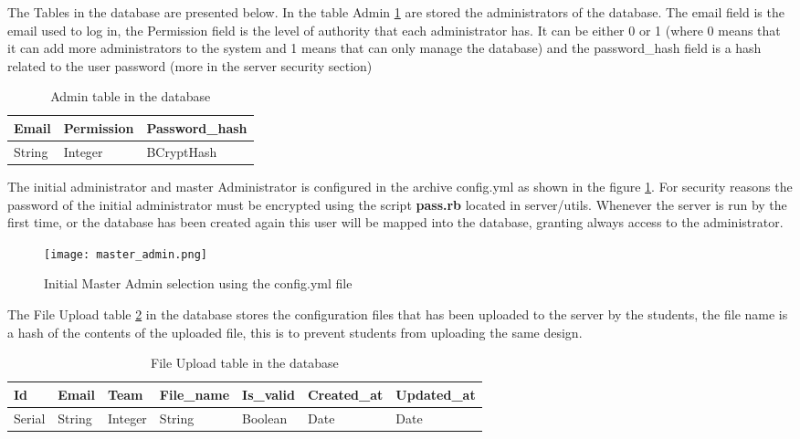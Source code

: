 The Tables in the database are presented below. In the table Admin \ref{tab:admin_table} are stored the administrators of the database. The email field is the email used to log in,
the Permission field is the level of authority that each administrator has. It can be either 0 or 1 (where 0 means that it can add
more administrators to the system and 1 means that can only manage the database) and the password\_hash field is a hash related to the user password (more in the server security section)

\begin{table}[h!]
\centering
    \begin{tabular}{ | l | l | l |}
    \hline
    Email & Permission & Password\_hash  \\ \hline
    String & Integer & BCryptHash \\ \hline
    \end{tabular}
    \caption{Admin table in the database}
    \label{tab:admin_table}
\end{table}

The initial administrator and master Administrator is configured in the archive config.yml as shown in the figure \ref{fig:admin_config}. For security reasons the password of 
the initial administrator must be encrypted using the script {\bf pass.rb} located in server/utils. Whenever the server is run by the first time, or the database
has been created again this user will be mapped into the database, granting always access to the administrator. 

\begin{figure}[htb]
\centering
\texttt{[image: master\_admin.png]}
\caption{Initial Master Admin selection using the config.yml file}
\label{fig:admin_config}
\end{figure}

The File Upload table \ref{tab:file_upload_table} in the database stores the configuration files that has been uploaded to the server by the students, the file name is a hash of the contents of the uploaded file,
this is to prevent students from uploading the same design.

\begin{table}[h!]
\centering
    \begin{tabular}{ | l | l | l | l | l | l | l |}
    \hline
    Id & Email & Team & File\_name & Is\_valid & Created\_at & Updated\_at  \\ \hline
    Serial & String & Integer & String & Boolean & Date & Date \\ \hline
    \end{tabular}
    \caption{File Upload table in the database}
    \label{tab:file_upload_table}
\end{table}

